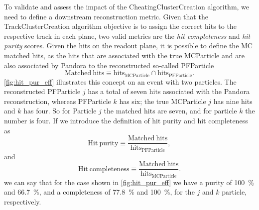 To validate and assess the impact of the CheatingClusterCreation algorithm, we need to define a downstream reconstruction metric. Given that the TrackClusterCreation algorithm objective is to assign the correct hits to the respective track in each plane, two valid metrics are the \emph{hit completeness} and \emph{hit purity} scores. Given the hits on the readout plane, it is possible to define the MC matched hits, as the hits that are associated with the true MCParticle and are also associated by Pandora to the reconstructed so-called PFParticle \begin{equation}
    \mathrm{Matched\ hits} \equiv \mathrm{hits_{MCParticle} \cap hits_{PFParticle}}.
\end{equation} \autoref{fig:hit_pur_eff} illustrates this concept on an event with two particles. The reconstructed PFParticle $j$ has a total of seven hits associated with the Pandora reconstruction, whereas PFParticle $k$ has six; the true MCParticle $j$ has nine hits and $k$ has four. So for Particle $j$ the matched hits are seven, and for particle $k$ the number is four. If we introduce the definition of hit purity and hit completeness as \begin{equation}
    \mathrm{Hit\ purity} \equiv \frac{\mathrm{Matched\ hits}}{\mathrm{hits_{PFParticle}}}, 
\end{equation} and \begin{equation}
    \mathrm{Hit\ completeness} \equiv \frac{\mathrm{Matched\ hits}}{\mathrm{hits_{MCParticle}}}. 
\end{equation} we can say that for the case shown in \autoref{fig:hit_pur_eff} we have a purity of \SI{100}{\percent} and \SI{66.7}{\percent}, and a completeness of \SI{77.8}{\percent} and \SI{100}{\percent}, for the $j$ and $k$ particle, respectively. 

